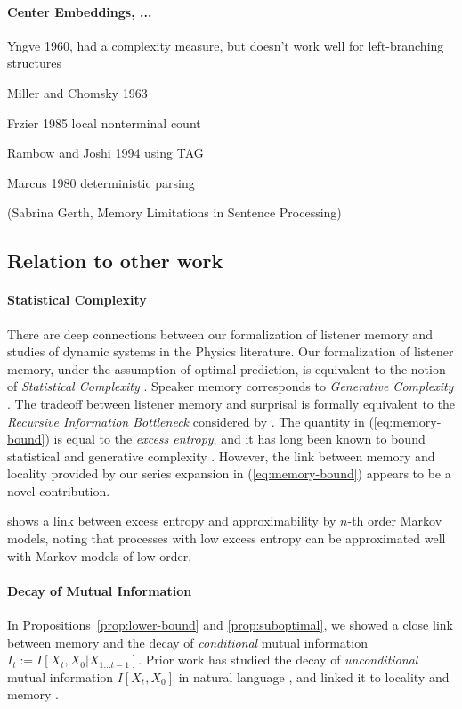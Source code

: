 \documentclass[11pt,letterpaper]{article}
\begin{document}
\paragraph{Center Embeddings, ...}
Yngve 1960, had a complexity measure, but doesn't work well for left-branching structures

Miller and Chomsky 1963

Frzier 1985 local nonterminal count

Rambow and Joshi 1994 using TAG

Marcus 1980 deterministic parsing

(Sabrina Gerth, Memory Limitations in Sentence Processing)


\subsection{Relation to other work}

\paragraph{Statistical Complexity}
There are deep connections between our formalization of listener memory and studies of dynamic systems in the Physics literature.
Our formalization of listener memory, under the assumption of optimal prediction, is equivalent to the notion of \emph{Statistical Complexity} \citep{crutchfield-inferring-1989}.
Speaker memory corresponds to \emph{Generative Complexity} \cite{loehr-non-sufficient-2008, loehr-predictive-2010}.
The tradeoff between listener memory and surprisal is formally equivalent to the \emph{Recursive Information Bottleneck} considered by \cite{still-information-2014}.
The quantity in (\ref{eq:memory-bound}) is equal to the \emph{excess entropy}, and it has long been known to bound statistical and generative complexity \citep{crutchfield-inferring-1989}.
However, the link between memory and locality provided by our series expansion in (\ref{eq:memory-bound}) appears to be a novel contribution.


\cite{sharan-prediction-2016} shows a link between excess entropy and approximability by $n$-th order Markov models, noting that processes with low excess entropy can be approximated well with Markov models of low order.



\paragraph{Decay of Mutual Information}
In Propositions~\ref{prop:lower-bound} and \ref{prop:suboptimal}, we showed a close link between memory and the decay of \emph{conditional} mutual information $I_t := I[X_t, X_0 | X_{1\dots t-1}]$.
Prior work has studied the decay of \emph{unconditional} mutual information $I[X_t, X_0]$ in natural language \citep{ebeling-entropy-1994,lin-critical-2017}, and linked it to locality and memory \citep{futrell-noisy-context-2017}.
\end{document}

